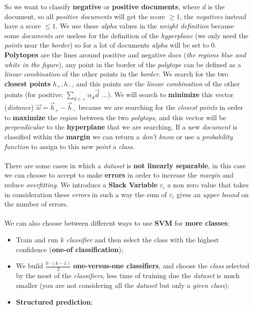 \documentclass{article}
\begin{document}
So we want to classify \textbf{negative} or \textbf{positive documents}, where $d$ is the document, so all \emph{positive documents} will get the score $\geq 1$, the \emph{negatives} instead have a score $\leq 1$. We use these \emph{alpha} values in the \emph{weight definition} because some \emph{documents} are useless for the definition of the \emph{hyperplane} (we only need the \emph{points} near the \emph{border}) so for a lot of documents \emph{alpha} will be set to 0. \textbf{Polytopes} are the lines around positive and negative docs (\emph{the regions blue and white in the figure}), any point in the border of the \emph{polytope} can be defined as a \emph{linear combination} of the other points in the \emph{border}. We search for the two \textbf{closest points} $h_{+}, h_{-}$, and this points are the \emph{linear combination} of the other points (for positive: $\sum_{d \in +} \alpha_d \vec{d}$ ...). We will search to \textbf{minimize} this vector (\emph{distance}) $\vec{w} = \vec{h}_{+} - \vec{h}_{-}$ because we are searching for the \emph{closest points} in order to \textbf{maximize} the \emph{region} between the two \emph{polytops}, and this vector will be \emph{perpendicular} to the \textbf{hyperplane} that we are searching. If a new \emph{document} is classified within the \textbf{margin} we can return a \emph{don't know} or use a \emph{probability function} to assign to this new \emph{point} a \emph{class}.\\\\
There are some cases in which a \emph{dataset} is \textbf{not linearly separable}, in this case we can choose to accept to make \textbf{errors} in order to increase the \emph{margin} and reduce \emph{overfitting}. We introduce a \textbf{Slack Variable} $\varepsilon_i$ a non zero value that takes in consideration these \emph{errors} in such a way the sum of $\varepsilon_i$ gives an \emph{upper bound} on the number of errors.\\\\
We can also choose between different ways to use \textbf{SVM} for\textbf{ more classes}:
\begin{itemize} 
\item Train and run $k$ \emph{classifier} and then select the class with the highest confidence (\textbf{one-of classification});
\item We build $\frac{k \cdot (k-1)}{2}$ \textbf{one-versus-one classifiers}, and choose the \emph{class} selected by the most of the \emph{classifiers}, less time of training due the \emph{dataset} is much smaller (you are not considering all the \emph{dataset} but only a \emph{given class});
\item \textbf{Structured prediction};
\end{itemize}
\end{document}
